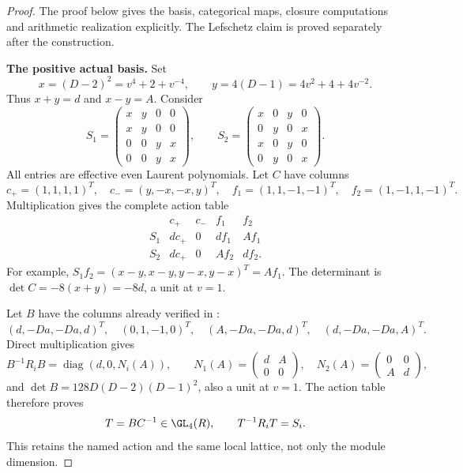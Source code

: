 \begin{proof}
The proof below gives the basis, categorical maps,
closure computations and arithmetic realization
explicitly. The Lefschetz claim is proved separately
after the construction.

\par\smallskip\noindent\textbf{The positive actual basis.}\quad
Set
\begin{equation}\label{eq:positiveIteratedXY}
 x=(D-2)^2=v^4+2+v^{-4},\qquad
 y=4(D-1)=4v^2+4+4v^{-2}.
\end{equation}
Thus \(x+y=d\) and \(x-y=A\).
Consider
\begin{equation}\label{eq:positiveIteratedMatrices}
 S_1=\begin{pmatrix}
 x&y&0&0\\x&y&0&0\\0&0&y&x\\0&0&y&x
 \end{pmatrix},\qquad
 S_2=\begin{pmatrix}
 x&0&y&0\\0&y&0&x\\x&0&y&0\\0&y&0&x
 \end{pmatrix}.
\end{equation}
All entries are effective even Laurent polynomials.
Let \(C\) have columns
\[
 c_+=(1,1,1,1)^T,\quad c_-=(y,-x,-x,y)^T,
 \quad f_1=(1,1,-1,-1)^T,\quad f_2=(1,-1,1,-1)^T.
\]
Multiplication gives the complete action table
\[
\begin{array}{c|cccc}
 &c_+&c_-&f_1&f_2\\\hline
 S_1&dc_+&0&df_1&Af_1\\
 S_2&dc_+&0&Af_2&df_2.
\end{array}
\]
For example,
\(S_1f_2=(x-y,x-y,y-x,y-x)^T=Af_1\).
The determinant is \(\det C=-8(x+y)=-8d\), a unit
at \(v=1\).

Let \(B\) have the columns already verified in
:
\[
 (d,-Da,-Da,d)^T,\quad(0,1,-1,0)^T,\quad
 (A,-Da,-Da,d)^T,\quad(d,-Da,-Da,A)^T.
\]
Direct multiplication gives
\[
 B^{-1}R_iB=\operatorname{diag}(d,0,N_i(A)),\qquad
 N_1(A)=\begin{pmatrix}d&A\\0&0\end{pmatrix},\quad
 N_2(A)=\begin{pmatrix}0&0\\A&d\end{pmatrix},
\]
and \(\det B=128D(D-2)(D-1)^2\), also a unit
at \(v=1\).
The action table therefore proves
\begin{equation}\label{eq:positiveIteratedIntertwiner}
 T=BC^{-1}\in\GL_4(R),\qquad T^{-1}R_iT=S_i.
\end{equation}
This retains the named action and the same local
lattice, not only the module dimension.


\end{proof}
